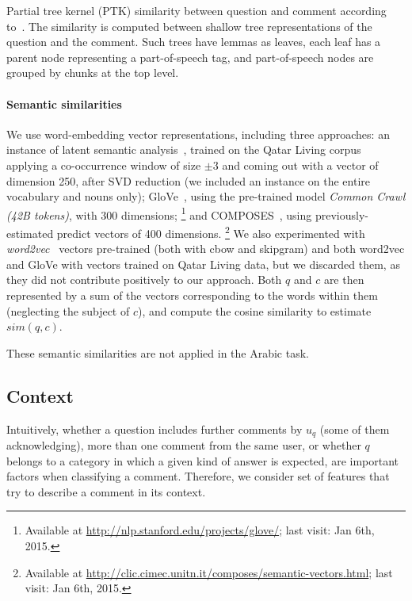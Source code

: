 Partial tree kernel (PTK) similarity between question and comment according 
to~\cite{Moschitti:2006}. The similarity is computed between shallow tree representations of the question and the comment. Such trees have lemmas as leaves, each leaf has a parent node representing a part-of-speech tag, and part-of-speech nodes are grouped by chunks at the top level.

\paragraph{Semantic similarities}
\label{ssub:semantic}

We use word-embedding vector representations, including three approaches:
\Ni an instance of latent semantic analysis~\cite{croce-previtali:2010:GEMS}, 
trained on the Qatar Living corpus applying a co-occurrence window of size 
$\pm3$ and coming out with a vector of dimension 250, after SVD reduction (we 
included an instance on the entire vocabulary and nouns only);
\Nii GloVe~\cite{Pennington:2014}, using the pre-trained model \textit{Common 
Crawl (42B tokens)}, with 300 dimensions;%
\footnote{Available at \url{http://nlp.stanford.edu/projects/glove/}; last 
visit: Jan 6th, 2015.}
and \Niii COMPOSES~\cite{Baroni:2014}, using previously-estimated predict 
vectors of 400 dimensions.%
\footnote{Available at 
\url{http://clic.cimec.unitn.it/composes/semantic-vectors.html}; last visit: Jan 
6th, 2015.}
We also experimented with \textit{word2vec}~\cite{Mikolov:2013} 
vectors pre-trained (both with cbow and skipgram) and both word2vec and GloVe 
with vectors trained on Qatar Living data, but we discarded them, as they did 
not contribute positively to our approach.
Both $q$ and $c$ are then represented by a sum of the vectors 
corresponding to the words within them (neglecting the subject of $c$), and 
compute the cosine similarity to estimate $sim(q,c)$. 

These semantic similarities are not applied in the Arabic task.

\subsection{Context }
\label{ssub:context}

Intuitively, whether a question includes further comments by $u_q$ (some of 
them acknowledging), more than one comment from the same user, or whether $q$ 
belongs to a category in which a given kind of answer is expected, are important 
factors when classifying a comment. Therefore, we consider set of features that 
try to describe a comment in its context.   

